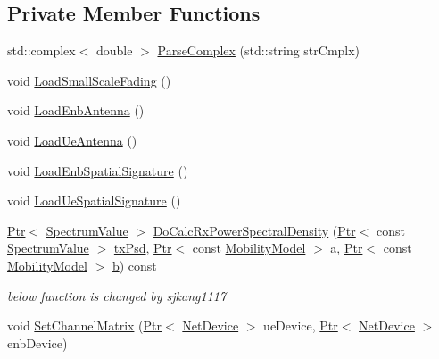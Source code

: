 \subsection*{Private Member Functions}
\begin{DoxyCompactItemize}
\item 
std\+::complex$<$ double $>$ \hyperlink{classns3_1_1MmWaveBeamforming_ac14df8250989c3400d482f974bf4104b}{Parse\+Complex} (std\+::string str\+Cmplx)
\item 
void \hyperlink{classns3_1_1MmWaveBeamforming_a39ae36102434b2cb39d54d7697a4d402}{Load\+Small\+Scale\+Fading} ()
\item 
void \hyperlink{classns3_1_1MmWaveBeamforming_a31546229e6a252ee04823b2f01ceed69}{Load\+Enb\+Antenna} ()
\item 
void \hyperlink{classns3_1_1MmWaveBeamforming_a8e3fe91ebf95867d52d080faab530865}{Load\+Ue\+Antenna} ()
\item 
void \hyperlink{classns3_1_1MmWaveBeamforming_a46c2d2f95724bfdcf4a2883957041da9}{Load\+Enb\+Spatial\+Signature} ()
\item 
void \hyperlink{classns3_1_1MmWaveBeamforming_a3b120db84cc1898fb9274a83f308716c}{Load\+Ue\+Spatial\+Signature} ()
\item 
\hyperlink{classns3_1_1Ptr}{Ptr}$<$ \hyperlink{classns3_1_1SpectrumValue}{Spectrum\+Value} $>$ \hyperlink{classns3_1_1MmWaveBeamforming_ad3ba8df3cac25621dda994fbd1a0080d}{Do\+Calc\+Rx\+Power\+Spectral\+Density} (\hyperlink{classns3_1_1Ptr}{Ptr}$<$ const \hyperlink{classns3_1_1SpectrumValue}{Spectrum\+Value} $>$ \hyperlink{lte__link__budget__x2__handover__measures_8m_a684fe3101a5e48a5fcc57cab8dbcd1aa}{tx\+Psd}, \hyperlink{classns3_1_1Ptr}{Ptr}$<$ const \hyperlink{classns3_1_1MobilityModel}{Mobility\+Model} $>$ a, \hyperlink{classns3_1_1Ptr}{Ptr}$<$ const \hyperlink{classns3_1_1MobilityModel}{Mobility\+Model} $>$ \hyperlink{lte__pathloss_8m_a21ad0bd836b90d08f4cf640b4c298e7c}{b}) const 
\begin{DoxyCompactList}\small\item\em below function is changed by sjkang1117 \end{DoxyCompactList}\item 
void \hyperlink{classns3_1_1MmWaveBeamforming_a16438840f78c78b12d3507f223deb40f}{Set\+Channel\+Matrix} (\hyperlink{classns3_1_1Ptr}{Ptr}$<$ \hyperlink{classns3_1_1NetDevice}{Net\+Device} $>$ ue\+Device, \hyperlink{classns3_1_1Ptr}{Ptr}$<$ \hyperlink{classns3_1_1NetDevice}{Net\+Device} $>$ enb\+Device)
\item 

\end{DoxyCompactItemize}
